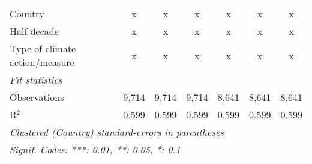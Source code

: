 \begin{tabular}{lcccccc}
   Country                                                 & x            & x            & x            & x            & x            & x\\  
   Half decade                                             & x            & x            & x            & x            & x            & x\\  
   Type of climate action/measure                          & x            & x            & x            & x            & x            & x\\  
   \midrule \emph{Fit statistics}\\
   Observations                                            & 9,714        & 9,714        & 9,714        & 8,641        & 8,641        & 8,641\\  
   R$^2$                                                   & 0.599        & 0.599        & 0.599        & 0.599        & 0.599        & 0.599\\  
   \midrule
   \multicolumn{7}{l}{\emph{Clustered (Country) standard-errors in parentheses}}\\
   \multicolumn{7}{l}{\emph{Signif. Codes: ***: 0.01, **: 0.05, *: 0.1}}\\
\end{tabular}
\par\endgroup


